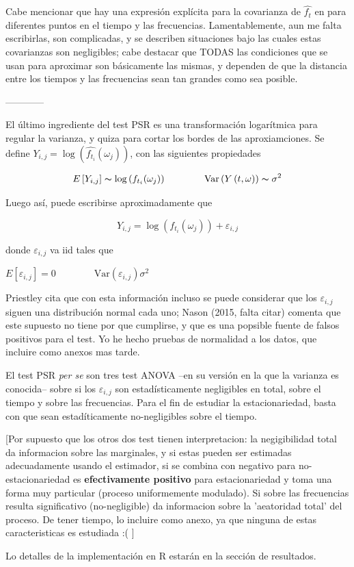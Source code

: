 Cabe mencionar que hay una expresi\'on expl\'icita para la covarianza de $\widehat{f_t}$
en para diferentes puntos en el tiempo y las frecuencias. Lamentablemente,
aun me falta escribirlas, son complicadas, y se describen situaciones bajo las
cuales estas covarianzas son negligibles; cabe destacar que TODAS las condiciones 
que se usan para aproximar son b\'asicamente las mismas, y dependen de que la distancia
entre los tiempos y las frecuencias sean tan grandes como sea posible.

------------

El \'ultimo ingrediente del test PSR es una transformaci\'on logar\'itmica
para regular la varianza, y quiza para cortar los bordes de las aproxiamciones.
Se define $Y_{i,j} = \log \left( \widehat{f_{t_i}}(\omega_j) \right)$, con las siguientes propiedades

\begin{equation*}
E\left[ Y_{i,j} \right] \thicksim \log \left( f_{t_i}(\omega_j) \right)
\hspace{4em}
\text{Var}\left( {Y\left(t,\omega\right)}\right) \thicksim \sigma^{2}
\end{equation*}

Luego as\'i, puede escribirse aproximadamente que

$$Y_{i,j} = \log \left( f_{t_i}(\omega_j) \right) + \varepsilon_{i,j}$$

donde $\varepsilon_{i,j}$ va iid tales que

$
E\left[ \varepsilon_{i,j} \right] = 0
\hspace{4em}
\text{Var}\left( \varepsilon_{i,j} \right) \sigma^{2}
$

Priestley cita que con esta informaci\'on incluso se puede considerar que los $\varepsilon_{i,j}$
siguen una distribuci\'on normal cada uno; Nason (2015, falta citar) comenta que
este supuesto no tiene por que cumplirse, y que es una popsible fuente de falsos positivos
para el test. Yo he hecho pruebas de normalidad a los datos, que incluire como anexos
mas tarde.

El test PSR \textit{per se} son tres test ANOVA --en su versi\'on en la que la varianza es conocida--
sobre si los $\varepsilon_{i,j}$ son estad\'isticamente negligibles en total, sobre el tiempo y sobre
las frecuencias. Para el fin de estudiar la estacionariedad, basta con que sean estad\'iticamente
no-negligibles sobre el tiempo.

[Por supuesto que los otros dos test tienen interpretacion: la negigibilidad total da informacion
sobre las marginales, y si estas pueden ser estimadas adecuadamente usando el estimador, si se
combina con negativo para no-estacionariedad es \textbf{efectivamente positivo} para estacionariedad
y toma una forma muy particular (proceso uniformemente modulado). Si sobre las frecuencias resulta
significativo (no-negligible) da informacion sobre la 'aeatoridad total' del proceso.
De tener tiempo, lo incluire como anexo, ya que ninguna de estas caracteristicas es estudiada :( ]

Lo detalles de la implementaci\'on en R estar\'an en la secci\'on de resultados.


